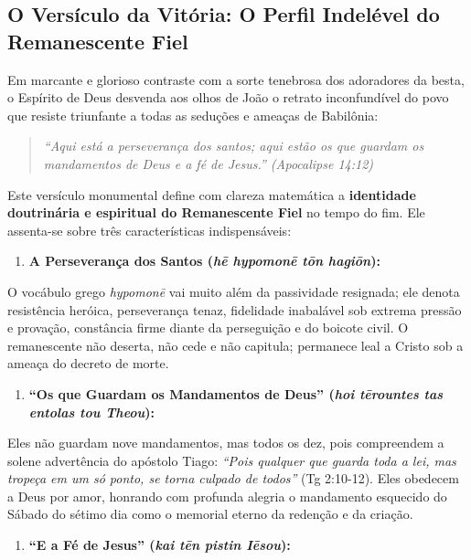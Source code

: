 \documentclass[11pt,a4paper,openany]{book}
\begin{document}
\subsection{O Versículo da Vitória: O Perfil Indelével do Remanescente Fiel}


Em marcante e glorioso contraste com a sorte tenebrosa dos adoradores da besta, o Espírito de Deus desvenda aos olhos de João o retrato inconfundível do povo que resiste triunfante a todas as seduções e ameaças de Babilônia:


\begin{quote}
\itshape \textit{``Aqui está a perseverança dos santos; aqui estão os que guardam os mandamentos de Deus e a fé de Jesus.''} (Apocalipse 14:12)
\end{quote}


Este versículo monumental define com clareza matemática a \textbf{identidade doutrinária e espiritual do Remanescente Fiel} no tempo do fim. Ele assenta-se sobre três características indispensáveis:

\begin{enumerate}
  \item \textbf{A Perseverança dos Santos (\textit{hē hypomonē tōn hagiōn}):}
\end{enumerate}

O vocábulo grego \textit{hypomonē} vai muito além da passividade resignada; ele denota resistência heróica, perseverança tenaz, fidelidade inabalável sob extrema pressão e provação, constância firme diante da perseguição e do boicote civil. O remanescente não deserta, não cede e não capitula; permanece leal a Cristo sob a ameaça do decreto de morte.
\begin{enumerate}
  \item \textbf{``Os que Guardam os Mandamentos de Deus'' (\textit{hoi tērountes tas entolas tou Theou}):}
\end{enumerate}

Eles não guardam nove mandamentos, mas todos os dez, pois compreendem a solene advertência do apóstolo Tiago: \textit{``Pois qualquer que guarda toda a lei, mas tropeça em um só ponto, se torna culpado de todos''} (Tg 2:10-12). Eles obedecem a Deus por amor, honrando com profunda alegria o mandamento esquecido do Sábado do sétimo dia como o memorial eterno da redenção e da criação.
\begin{enumerate}
  \item \textbf{``E a Fé de Jesus'' (\textit{kai tēn pistin Iēsou}):}
\end{enumerate}
\end{document}
